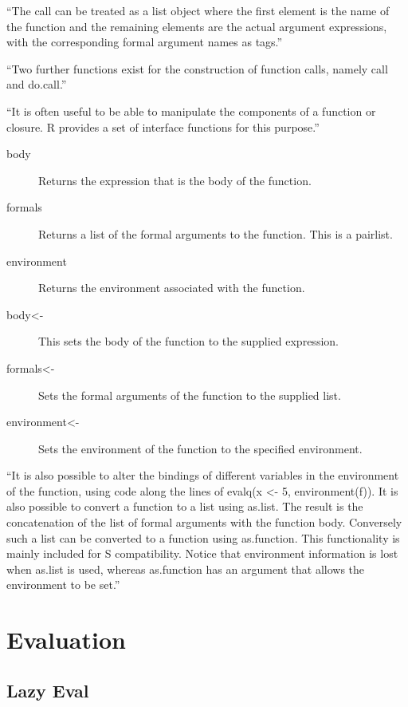 ``The call can be treated as a list object where the first element is the name of the function and the remaining elements are the actual argument expressions, with the corresponding formal argument names as tags.''

``Two further functions exist for the construction of function calls, namely call and do.call.''

``It is often useful to be able to manipulate the components of a function or closure. R provides a set of interface functions for this purpose.''

\begin{description}
\item [body]
Returns the expression that is the body of the function.
\item [formals]
Returns a list of the formal arguments to the function. This is a pairlist.
\item [environment]
Returns the environment associated with the function.
\item [body<-]
This sets the body of the function to the supplied expression.
\item [formals<-]
Sets the formal arguments of the function to the supplied list.
\item [environment<-]
Sets the environment of the function to the specified environment.
\end{description}

``It is also possible to alter the bindings of different variables in the environment of the function, using code along the lines of evalq(x <- 5, environment(f)).
It is also possible to convert a function to a list using as.list. The result is the concatenation of the list of formal arguments with the function body. Conversely such a list can be converted to a function using as.function. This functionality is mainly included for S compatibility. Notice that environment information is lost when as.list is used, whereas as.function has an argument that allows the environment to be set.''


\section{Evaluation}
\label{sect:eval}



\subsection{Lazy Eval}
\label{subs:rlazy}

